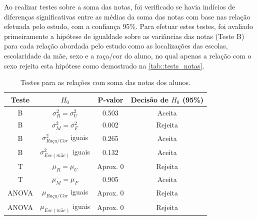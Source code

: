 Ao realizar testes sobre a soma das notas, foi verificado se havia indícios de diferenças significativas entre as médias
da soma das notas com base nas relação efetuada pelo estudo, com a confiança 95\%.
Para efetuar estes testes, foi avaliado primeiramente a hipótese de igualdade sobre as variâncias
das notas (Teste B) para cada relação abordada pelo estudo como as localizações das escolas, 
escolaridade da mãe, sexo e a raça/cor do aluno, no qual apenas a relação com o sexo rejeita esta hipótese
como demostrado na \autoref{tab::tests_notas}.

\newpage
\begin{table}[htb]
\caption{Testes para as relações com soma
 das notas dos alunos.\label{tab::tests_notas}}
    \centering
    \begin{tabular}{cccc}
    \toprule
    Teste & $H_0$& P-valor & Decisão de $H_0$ (95\%)\\
    \midrule \midrule
    B & $\sigma_R^2 = \sigma_U^2$ & 0.503 & Aceita\\
    B & $\sigma_M^2 = \sigma_F^2$ & 0.002 & Rejeita\\
    B & $\sigma_{Raça/Cor}^2$ iguais & 0.265 & Aceita\\
    B & $\sigma_{Esc(mãe)}^2$ iguais & 0.132 & Aceita\\
    T & $\mu_R = \mu_U$ & Aprox. 0 & Rejeita\\
    T & $\mu_M = \mu_F$ & 0.905 & Aceita\\
    ANOVA & $\mu_{Raça/Cor}$ iguais & Aprox. 0 & Rejeita\\
    ANOVA & $\mu_{Esc(mãe)}$ iguais & Aprox. 0 & Rejeita\\
    \bottomrule
    \end{tabular}
\end{table}

